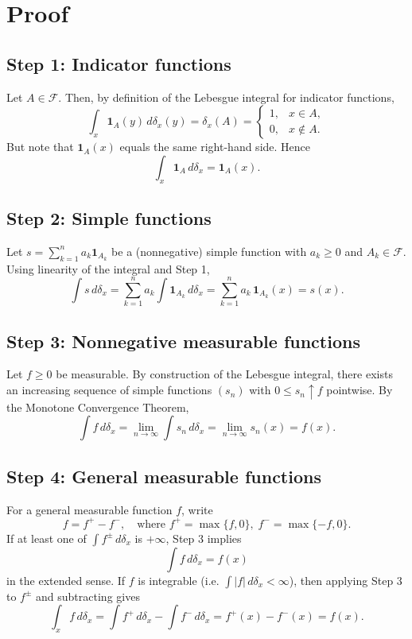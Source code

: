 \documentclass[11pt]{report}
\begin{document}
\section*{Proof}
\subsection*{Step 1: Indicator functions}

Let $A \in \mathcal{F}$. Then, by definition of the Lebesgue integral for indicator functions,
\[
\int_{x} \mathbf{1}_A(y) \, d\delta_x(y) = \delta_x(A) =
\begin{cases}
1, & x \in A, \\
0, & x \notin A.
\end{cases}
\]
But note that $\mathbf{1}_A(x)$ equals the same right-hand side. Hence
\[
\int_{x} \mathbf{1}_A \, d\delta_x = \mathbf{1}_A(x).
\]

\subsection*{Step 2: Simple functions}

Let $s = \sum_{k=1}^n a_k \mathbf{1}_{A_k}$ be a (nonnegative) simple function with $a_k \geq 0$ and $A_k \in \mathcal{F}$.  
Using linearity of the integral and Step 1,
\[
\int s \, d\delta_x = \sum_{k=1}^n a_k \int \mathbf{1}_{A_k} \, d\delta_x
= \sum_{k=1}^n a_k \, \mathbf{1}_{A_k}(x) = s(x).
\]

\subsection*{Step 3: Nonnegative measurable functions}

Let $f \geq 0$ be measurable. By construction of the Lebesgue integral, there exists an increasing sequence of simple functions $(s_n)$ with $0 \leq s_n \uparrow f$ pointwise.  
By the Monotone Convergence Theorem,
\[
\int f \, d\delta_x = \lim_{n \to \infty} \int s_n \, d\delta_x
= \lim_{n \to \infty} s_n(x) = f(x).
\]

\subsection*{Step 4: General measurable functions}

For a general measurable function $f$, write
\[
f = f^+ - f^-, \quad \text{where } f^+ = \max\{f,0\}, \; f^- = \max\{-f,0\}.
\]
If at least one of $\int f^\pm \, d\delta_x$ is $+\infty$, Step 3 implies
\[
\int f \, d\delta_x = f(x)
\]
in the extended sense.  
If $f$ is integrable (i.e. $\int |f| \, d\delta_x < \infty$), then applying Step 3 to $f^\pm$ and subtracting gives
\[
\int_{x} f \, d\delta_x = \int f^+ \, d\delta_x - \int f^- \, d\delta_x
= f^+(x) - f^-(x) = f(x).
\]



\end{document}
